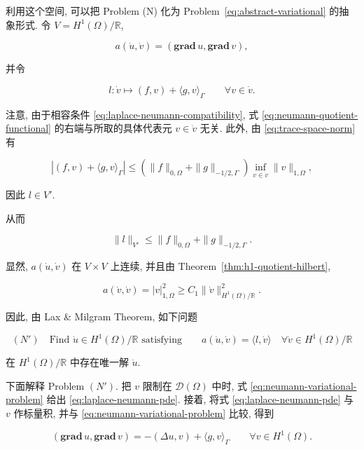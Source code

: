 利用这个空间, 可以把 Problem (N) 化为 Problem~\eqref{eq:abstract-variational} 的抽象形式.
令 $V=H^1(\Omega)/\mathbb R$,

\[
a(\dot u,\dot v)=(\mathbf{grad}\,u,\mathbf{grad}\,v),
\]

并令

\begin{equation}\label{eq:neumann-quotient-functional}
l:\dot v\mapsto(f,v)+\langle g,v\rangle_\Gamma\qquad\forall v\in\dot v.
\end{equation}

注意, 由于相容条件 \eqref{eq:laplace-neumann-compatibility}, 式
\eqref{eq:neumann-quotient-functional} 的右端与所取的具体代表元 $v\in\dot v$ 无关.
此外, 由 \eqref{eq:trace-space-norm} 有

\[
|(f,v)+\langle g,v\rangle_\Gamma|\leq(\|f\|_{0,\Omega}+\|g\|_{-1/2,\Gamma})\inf_{v\in\dot v}\|v\|_{1,\Omega},
\]

因此 $l\in V'$.


从而

\begin{equation}\label{eq:neumann-functional-bound}
\|l\|_{V'}\leq\|f\|_{0,\Omega}+\|g\|_{-1/2,\Gamma}.
\end{equation}

显然, $a(\dot u,\dot v)$ 在 $V\times V$ 上连续, 并且由
Theorem~\ref{thm:h1-quotient-hilbert},

\[
a(\dot v,\dot v)=|v|_{1,\Omega}^2\geq C_1\|\dot v\|_{H^1(\Omega)/\mathbb R}^2.
\]

因此, 由 Lax \& Milgram Theorem, 如下问题

\begin{equation}\label{eq:neumann-variational-problem}
(N')\quad\text{Find }\dot u\in H^1(\Omega)/\mathbb R\text{ satisfying}\qquad a(\dot u,\dot v)=\langle l,\dot v\rangle\quad\forall\dot v\in H^1(\Omega)/\mathbb R
\end{equation}

在 $H^1(\Omega)/\mathbb R$ 中存在唯一解 $\dot u$.

下面解释 Problem $(N')$. 把 $v$ 限制在 $\mathcal D(\Omega)$ 中时,
式 \eqref{eq:neumann-variational-problem} 给出 \eqref{eq:laplace-neumann-pde}.
接着, 将式 \eqref{eq:laplace-neumann-pde} 与 $v$ 作标量积, 并与
\eqref{eq:neumann-variational-problem} 比较, 得到

\begin{equation}\label{eq:neumann-green-weak-boundary}
(\mathbf{grad}\,u,\mathbf{grad}\,v)=-(\Delta u,v)+\langle g,v\rangle_\Gamma\qquad\forall v\in H^1(\Omega).
\end{equation}

